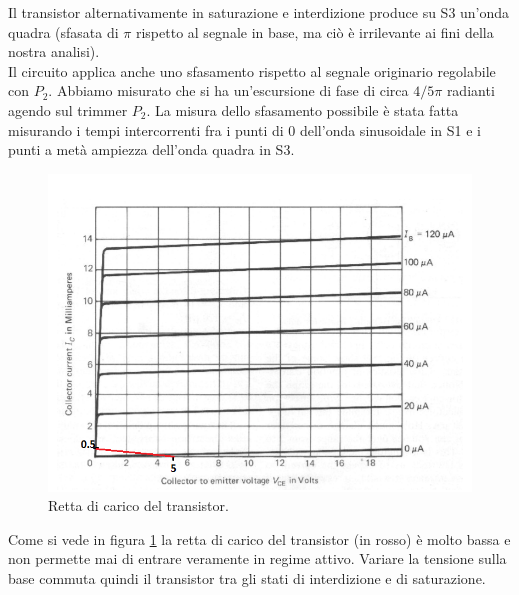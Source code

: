 \documentclass[10pt,a4paper]{article}
\begin{document}
Il transistor alternativamente in saturazione e interdizione produce su S3 un'onda quadra (sfasata di $\pi$ rispetto al segnale in base, ma ciò è irrilevante ai fini della nostra analisi).\\
Il circuito applica anche uno sfasamento rispetto al segnale originario regolabile con $P_2$. 
Abbiamo misurato che si ha un'escursione di fase di circa $4/5 \pi$ radianti agendo sul trimmer $P_2$. La misura dello sfasamento possibile è stata fatta misurando i tempi intercorrenti fra i punti di 0 dell'onda sinusoidale in S1 e i punti a metà ampiezza  dell'onda quadra in S3.\\


\begin{figure}[!htb]
  \centering
  \includegraphics[scale=0.6]{transistorbjt.png}
\caption{Retta di carico del transistor.\label{fig:transistor}}
\end{figure}

Come si vede in figura \ref{fig:transistor} la retta di carico del transistor (in rosso) è molto bassa e non permette mai di entrare veramente in regime attivo. Variare la tensione sulla base commuta quindi il transistor tra gli stati di interdizione e di saturazione.\\

\end{document}
